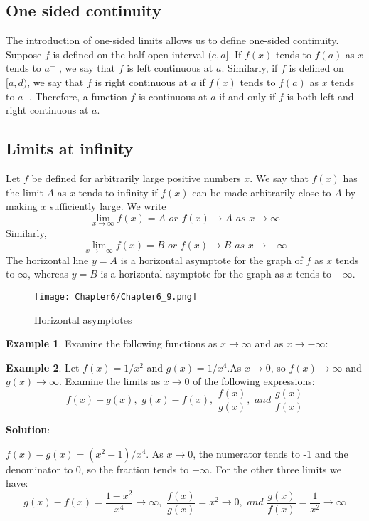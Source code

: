 \documentclass[10pt,a4paper]{book}
\theoremstyle{definition}\newtheorem{definition}{Definition}
\theoremstyle{definition}\newtheorem{fact}{Fact}
\theoremstyle{definition}\newtheorem{ex}{Ex.}
\theoremstyle{definition}\newtheorem{project}{Project}
\theoremstyle{definition}\newtheorem{problem}{Problem}
\theoremstyle{definition}\newtheorem{example}{Example}
\numberwithin{theorem}{chapter}
\numberwithin{corollary}{chapter}
\numberwithin{assumption}{chapter}
\numberwithin{definition}{chapter}
\numberwithin{prop}{chapter}
\numberwithin{notation}{chapter}
\numberwithin{problem}{chapter}
\numberwithin{example}{chapter}
\numberwithin{fact}{chapter}
\numberwithin{ex}{chapter}
\begin{document}
	\subsection{One sided continuity}
	
	The introduction of one-sided limits allows us to define one-sided continuity. Suppose $f$ is defined on the half-open interval $(c, a]$. If $f (x)$ tends to $f (a)$ as $x$ tends to $a^{-}$ , we say that $f$ is left continuous at $a$. Similarly, if $f$ is defined on $[a, d)$, we say that $f$ is right continuous at $a$ if $f(x)$ tends to $f(a)$ as $x$ tends to $a^{+}$. Therefore, a function $f$ is continuous at $a$ if and only if $f$ is both left and right continuous at $a$.
	
	\subsection{Limits at infinity}
	
	Let $f$ be defined for arbitrarily large positive numbers $x$. We say that $f (x)$ has the limit $A$ as $x$ tends to infinity if $f (x)$ can be made arbitrarily close to $A$ by making $x$ sufficiently large. We write
	$$\lim_{x \rightarrow \infty} f(x) = A \,\,or\,\, f(x) \rightarrow A \,\,as\,\, x \rightarrow \infty$$
	Similarly, 
	$$\lim_{x \rightarrow -\infty} f(x) = B \,\,or\,\, f(x) \rightarrow B \,\,as\,\, x \rightarrow -\infty$$
	The horizontal line $y = A$ is a horizontal asymptote for the graph of $f$ as $x$ tends to $\infty$, whereas $y = B$ is a horizontal asymptote for the graph as $x$ tends to $-\infty$.
	\begin{figure}[H]
		\centering
		\texttt{[image: Chapter6/Chapter6\_9.png]}
		\caption{Horizontal asymptotes}
	\end{figure}
	
	\begin{example}
		Examine the following functions as $x \rightarrow \infty$ and as $x \rightarrow -\infty$:
	\end{example}
	
	\begin{example}
		Let $f(x)=1/x^2$ and $g(x)=1/x^4$.As $x\rightarrow 0$, so $f(x)\rightarrow \infty$ and $g(x)\rightarrow \infty$. Examine the limits as $x \rightarrow 0$ of the following expressions:
		$$f(x)-g(x), \,\,g(x)-f(x), \,\, \frac{f(x)}{g(x)}, \,\,and\,\,\frac{g(x)}{f(x)}$$
		
		\textbf{Solution}:
		
		$f(x) - g(x) = (x^2 - 1)/x^4$. As $x \rightarrow 0$, the numerator tends to -1 and the denominator to 0, so the fraction tends to $-\infty$. For the other three limits we have:
		$$g(x)-f(x) = \frac{1-x^2}{x^4} \rightarrow \infty , \,\, \frac{f(x)}{g(x)}=x^2 \rightarrow 0, \,\, and \,\,\frac{g(x)}{f(x)} = \frac{1}{x^2} \rightarrow \infty$$
	\end{example}
	
\end{document}
